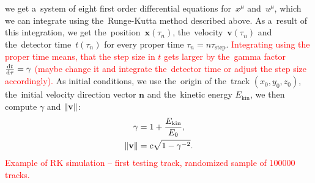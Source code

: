 		we get a~system of eight first order differential equations for~$x^\mu$ and~$u^\mu$, which we can integrate using the~Runge-Kutta method described above. As a~result of this integration, we get the~position~$\mathbf{x}(\tau_n)$, the~velocity~$\mathbf{v}(\tau_n)$ and the~detector time~$t(\tau_n)$ for every proper time $\tau_n = n \tau_\text{step}$. \textcolor{red}{Integrating using the proper time means, that the step size in $t$ gets larger by the~gamma factor $\derivative{t}{\tau} = \gamma$ (maybe change it and integrate the~detector time or adjust the step size accordingly).} As initial conditions, we use the~origin of the~track $(x_0,y_0,z_0)$, the~initial velocity direction vector $\mathbf{n}$ and the~kinetic energy $E_\text{kin}$, we then compute $\gamma$ and $\norm{\mathbf{v}}$:
			\begin{align}
				\gamma &= 1 + \frac{E_\text{kin}}{E_0},\\
				\norm{\mathbf{v}} &= c\sqrt{1-\gamma^{-2}}.
			\end{align}
		\textcolor{red}{Example of RK simulation -- first testing track, randomized sample of 100000 tracks.}